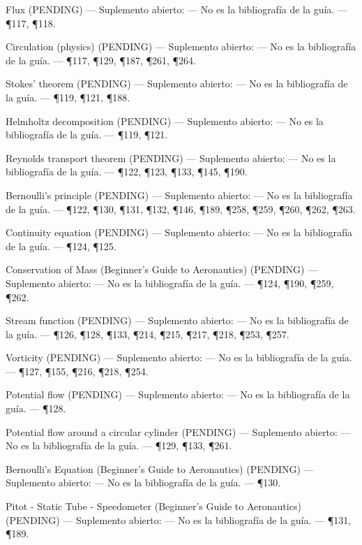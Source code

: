 \documentclass[10pt,openany]{book}
\begin{document}
\noindent Flux (PENDING) --- Suplemento abierto: --- No es la bibliografía de la guía. --- \P117, \P118.\par
\noindent Circulation (physics) (PENDING) --- Suplemento abierto: --- No es la bibliografía de la guía. --- \P117, \P129, \P187, \P261, \P264.\par
\noindent Stokes' theorem (PENDING) --- Suplemento abierto: --- No es la bibliografía de la guía. --- \P119, \P121, \P188.\par
\noindent Helmholtz decomposition (PENDING) --- Suplemento abierto: --- No es la bibliografía de la guía. --- \P119, \P121.\par
\noindent Reynolds transport theorem (PENDING) --- Suplemento abierto: --- No es la bibliografía de la guía. --- \P122, \P123, \P133, \P145, \P190.\par
\noindent Bernoulli's principle (PENDING) --- Suplemento abierto: --- No es la bibliografía de la guía. --- \P122, \P130, \P131, \P132, \P146, \P189, \P258, \P259, \P260, \P262, \P263.\par
\noindent Continuity equation (PENDING) --- Suplemento abierto: --- No es la bibliografía de la guía. --- \P124, \P125.\par
\noindent Conservation of Mass (Beginner's Guide to Aeronautics) (PENDING) --- Suplemento abierto: --- No es la bibliografía de la guía. --- \P124, \P190, \P259, \P262.\par
\noindent Stream function (PENDING) --- Suplemento abierto: --- No es la bibliografía de la guía. --- \P126, \P128, \P133, \P214, \P215, \P217, \P218, \P253, \P257.\par
\noindent Vorticity (PENDING) --- Suplemento abierto: --- No es la bibliografía de la guía. --- \P127, \P155, \P216, \P218, \P254.\par
\noindent Potential flow (PENDING) --- Suplemento abierto: --- No es la bibliografía de la guía. --- \P128.\par
\noindent Potential flow around a circular cylinder (PENDING) --- Suplemento abierto: --- No es la bibliografía de la guía. --- \P129, \P133, \P261.\par
\noindent Bernoulli's Equation (Beginner's Guide to Aeronautics) (PENDING) --- Suplemento abierto: --- No es la bibliografía de la guía. --- \P130.\par
\noindent Pitot - Static Tube - Speedometer (Beginner's Guide to Aeronautics) (PENDING) --- Suplemento abierto: --- No es la bibliografía de la guía. --- \P131, \P189.\par
\end{document}
